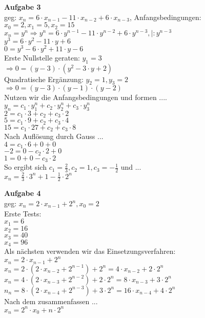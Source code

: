 \documentclass[a4paper]{scrartcl}
\begin{document}
	\begin{flushleft}
		\textbf{Aufgabe 3}\\
		geg: $x_n=6\cdot x_{n-1}-11\cdot x_{n-2}+ 6\cdot x_{n-3}$, Anfangsbedingungen: $x_0=2, x_1=5, x_2=15$\\[1em]
		$x_n=y^n \Rightarrow y^n=6\cdot y^{n-1}-11\cdot y^{n-2}+6\cdot y^{n-3}, |:y^{n-3}$\\
		$y^3=6\cdot y^2-11\cdot y+6$\\
		$0 = y^3-6\cdot y^2+11\cdot y-6$\\
		Erste Nullstelle geraten: $y_1=3$\\
		$\Rightarrow 0=(y-3)\cdot(y^2-3\cdot y+2)$\\
		Quadratische Ergänzung: $y_2=1, y_3=2$\\
		$\Rightarrow 0=(y-3)\cdot(y-1)\cdot(y-2)$\\
		Nutzen wir die Anfangsbedingungen und formen ....\\
		$y_n=c_1\cdot y_1^n+c_2\cdot y_2^n+c_3\cdot y_3^n$\\
		$2=c_1\cdot 3+c_2+c_3\cdot 2$\\
		$5=c_1\cdot 9+c_2+c_3\cdot 4$\\
		$15=c_1\cdot 27+c_2+c_3\cdot 8$\\
		Nach Auflösung durch Gauss ...\\
		$4=c_1\cdot 6+0+0$\\
		$-2=0-c_2\cdot 2+0$\\
		$1=0+0-c_3\cdot 2$\\
		So ergibt sich $c_1=\frac{2}{3}, c_2=1, c_3=-\frac{1}{2}$ und ...\\
		$x_n=\frac{2}{3}\cdot 3^n+1-\frac{1}{2}\cdot 2^n$\\
	\end{flushleft}
	\begin{flushleft}
		\textbf{Aufgabe 4}\\
		geg: $x_n=2\cdot x_{n-1}+2^n, x_0=2$\\
		Erste Tests:\\
		$x_1=6$\\		
		$x_2=16$\\
		$x_3=40$\\
		$x_4=96$\\
		Als nächsten verwenden wir das Einsetzungsverfahren:\\
		$x_n=2\cdot x_{n-1}+2^n$\\
		$x_n=2\cdot (2\cdot x_{n-2}+2^{n-1})+2^n=4\cdot x_{n-2}+2\cdot 2^n$\\
		$x_n=4\cdot (2\cdot x_{n-3}+2^{n-2})+2\cdot 2^n=8\cdot x_{n-3}+3\cdot 2^n$\\
		$n_n=8\cdot (2\cdot x_{n-4}+2^{n-3})+3\cdot 2^n=16\cdot x_{n-4}+4\cdot 2^n$\\
		Nach dem zusammenfassen ...\\
		$x_n=2^n\cdot x_0+n\cdot 2^n$\\
	\end{flushleft}
\end{document}
